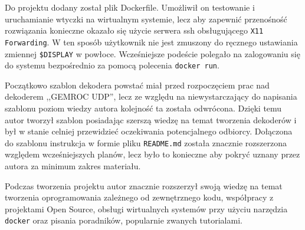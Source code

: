 \documentclass[a4paper, 11pt, twoside, openright]{article}
\begin{document}
	Do projektu dodany został plik
	Dockerfile. Umożliwił on testowanie i uruchamianie wtyczki na wirtualnym systemie, lecz aby zapewnić przenośność rozwiązania konieczne
	okazało się użycie serwera ssh obsługującego \texttt{X11 Forwarding}. W ten sposób użytkownik nie jest zmuszony do ręcznego ustawiania zmiennej
	\texttt{\$DISPLAY} w powłoce. Wcześniejsze podeście polegało na zalogowaniu się do systemu bezpośrednio za pomocą polecenia \texttt{docker run}.

	Początkowo szablon dekodera powstać miał przed rozpoczęciem prac nad dekoderem ,,GEMROC UDP'', lecz ze względu na niewystarczający do napisania
	szablonu poziom wiedzy autora kolejność ta została odwrócona. Dzięki temu autor tworzył szablon posiadając szerszą wiedzę na temat tworzenia
	dekoderów i był w stanie celniej przewidzieć oczekiwania potencjalnego odbiorcy. Dołączona do szablonu instrukcja w formie pliku \texttt{README.md}
	została znacznie rozszerzona względem wcześniejszych planów, lecz było to konieczne aby pokryć uznany przez autora za minimum zakres materiału.

	Podczas tworzenia projektu autor znacznie rozszerzył swoją wiedzę na temat tworzenia oprogramowania zależnego od zewnętrznego kodu,
	współpracy z projektami Open Source, obsługi wirtualnych systemów przy użyciu narzędzia \texttt{docker} oraz pisania poradników,
	popularnie zwanych tutorialami.
\end{document}
